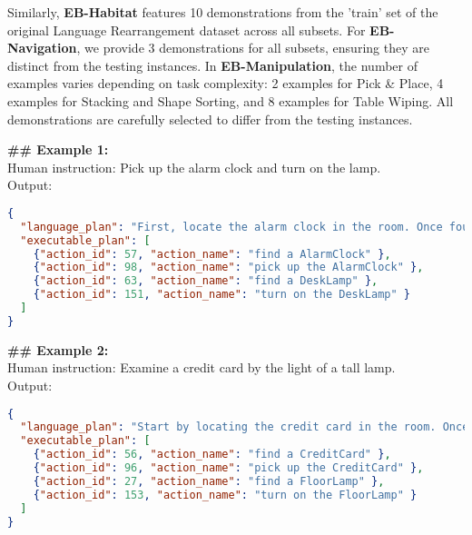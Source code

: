 Similarly, \textbf{EB-Habitat} features 10 demonstrations from the 'train' set of the original Language Rearrangement dataset \cite{szot2023large} across all subsets. For \textbf{EB-Navigation}, we provide 3 demonstrations for all subsets, ensuring they are distinct from the testing instances.
In \textbf{EB-Manipulation}, the number of examples varies depending on task complexity: 2 examples for Pick \& Place, 4 examples for Stacking and Shape Sorting, and 8 examples for Table Wiping. All demonstrations are carefully selected to differ from the testing instances.



\begin{tcolorbox}[colback=gray!5!white, colframe=gray!75!black, 
title={In-context examples for EB-ALFRED tasks excluding long horizon tasks}, boxrule=0.5mm, width=\textwidth, arc=3mm, auto outer arc=true]
\textbf{\#\# Example 1:}\\
Human instruction: Pick up the alarm clock and turn on the lamp.\\
Output:
\lstset{frame=none} %
\begin{lstlisting}[language=json]
{
  "language_plan": "First, locate the alarm clock in the room. Once found, carefully pick up the alarm clock. Next, identify the location of the desk lamp. After locating the desk lamp, proceed to turn it on.",
  "executable_plan": [
    {"action_id": 57, "action_name": "find a AlarmClock" },
    {"action_id": 98, "action_name": "pick up the AlarmClock" },
    {"action_id": 63, "action_name": "find a DeskLamp" },
    {"action_id": 151, "action_name": "turn on the DeskLamp" }
  ]
}
\end{lstlisting}
\textbf{\#\# Example 2:}\\
Human instruction: Examine a credit card by the light of a tall lamp.\\
Output:
\begin{lstlisting}[language=json]
{
  "language_plan": "Start by locating the credit card in the room. Once you have found the credit card, proceed to pick it up. Then, search for the floor lamp and find its location. After finding the floor lamp, turn it on to illuminate the area so you can examine the credit card effectively.",
  "executable_plan": [
    {"action_id": 56, "action_name": "find a CreditCard" },
    {"action_id": 96, "action_name": "pick up the CreditCard" },
    {"action_id": 27, "action_name": "find a FloorLamp" },
    {"action_id": 153, "action_name": "turn on the FloorLamp" }
  ]
}
\end{lstlisting}

\end{tcolorbox}
